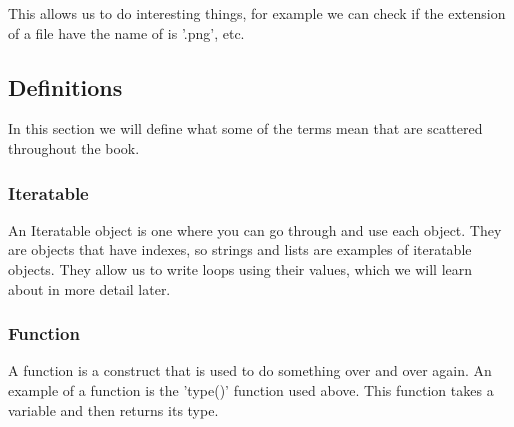 This allows us to do interesting things, for example we can check if the
extension of a file have the name of is '.png', etc.

\subsection{Definitions}

In this section we will define what some of the terms mean that are scattered
throughout the book.

\subsubsection{Iteratable}

An Iteratable object is one where you can go through and use each object. They
are objects that have indexes, so strings and lists are examples of iteratable
objects. They allow us to write loops using their values, which we will learn
about in more detail later.

\subsubsection{Function}

A function is a construct that is used to do something over and over again.
An example of a function is the 'type()' function used above. This function
takes a variable and then returns its type.

